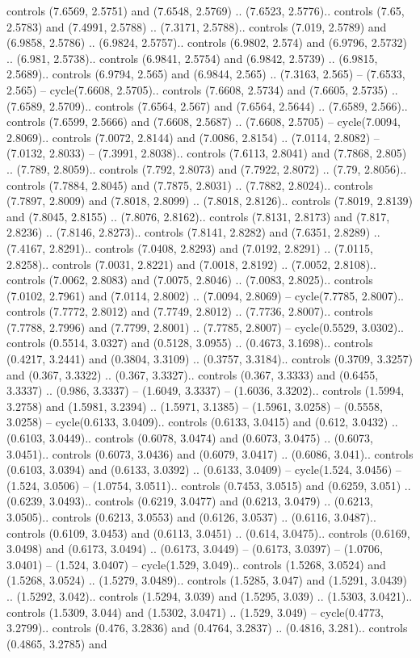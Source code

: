 controls (7.6569, 2.5751) and (7.6548, 2.5769) .. (7.6523, 2.5776).. controls (7.65, 2.5783) and (7.4991, 2.5788) .. (7.3171, 2.5788).. controls (7.019, 2.5789) and (6.9858, 2.5786) .. (6.9824, 2.5757).. controls (6.9802, 2.574) and (6.9796, 2.5732) .. (6.981, 2.5738).. controls (6.9841, 2.5754) and (6.9842, 2.5739) .. (6.9815, 2.5689).. controls (6.9794, 2.565) and (6.9844, 2.565) .. (7.3163, 2.565) -- (7.6533, 2.565) -- cycle(7.6608, 2.5705).. controls (7.6608, 2.5734) and (7.6605, 2.5735) .. (7.6589, 2.5709).. controls (7.6564, 2.567) and (7.6564, 2.5644) .. (7.6589, 2.566).. controls (7.6599, 2.5666) and (7.6608, 2.5687) .. (7.6608, 2.5705) -- cycle(7.0094, 2.8069).. controls (7.0072, 2.8144) and (7.0086, 2.8154) .. (7.0114, 2.8082) -- (7.0132, 2.8033) -- (7.3991, 2.8038).. controls (7.6113, 2.8041) and (7.7868, 2.805) .. (7.789, 2.8059).. controls (7.792, 2.8073) and (7.7922, 2.8072) .. (7.79, 2.8056).. controls (7.7884, 2.8045) and (7.7875, 2.8031) .. (7.7882, 2.8024).. controls (7.7897, 2.8009) and (7.8018, 2.8099) .. (7.8018, 2.8126).. controls (7.8019, 2.8139) and (7.8045, 2.8155) .. (7.8076, 2.8162).. controls (7.8131, 2.8173) and (7.817, 2.8236) .. (7.8146, 2.8273).. controls (7.8141, 2.8282) and (7.6351, 2.8289) .. (7.4167, 2.8291).. controls (7.0408, 2.8293) and (7.0192, 2.8291) .. (7.0115, 2.8258).. controls (7.0031, 2.8221) and (7.0018, 2.8192) .. (7.0052, 2.8108).. controls (7.0062, 2.8083) and (7.0075, 2.8046) .. (7.0083, 2.8025).. controls (7.0102, 2.7961) and (7.0114, 2.8002) .. (7.0094, 2.8069) -- cycle(7.7785, 2.8007).. controls (7.7772, 2.8012) and (7.7749, 2.8012) .. (7.7736, 2.8007).. controls (7.7788, 2.7996) and (7.7799, 2.8001) .. (7.7785, 2.8007) -- cycle(0.5529, 3.0302).. controls (0.5514, 3.0327) and (0.5128, 3.0955) .. (0.4673, 3.1698).. controls (0.4217, 3.2441) and (0.3804, 3.3109) .. (0.3757, 3.3184).. controls (0.3709, 3.3257) and (0.367, 3.3322) .. (0.367, 3.3327).. controls (0.367, 3.3333) and (0.6455, 3.3337) .. (0.986, 3.3337) -- (1.6049, 3.3337) -- (1.6036, 3.3202).. controls (1.5994, 3.2758) and (1.5981, 3.2394) .. (1.5971, 3.1385) -- (1.5961, 3.0258) -- (0.5558, 3.0258) -- cycle(0.6133, 3.0409).. controls (0.6133, 3.0415) and (0.612, 3.0432) .. (0.6103, 3.0449).. controls (0.6078, 3.0474) and (0.6073, 3.0475) .. (0.6073, 3.0451).. controls (0.6073, 3.0436) and (0.6079, 3.0417) .. (0.6086, 3.041).. controls (0.6103, 3.0394) and (0.6133, 3.0392) .. (0.6133, 3.0409) -- cycle(1.524, 3.0456) -- (1.524, 3.0506) -- (1.0754, 3.0511).. controls (0.7453, 3.0515) and (0.6259, 3.051) .. (0.6239, 3.0493).. controls (0.6219, 3.0477) and (0.6213, 3.0479) .. (0.6213, 3.0505).. controls (0.6213, 3.0553) and (0.6126, 3.0537) .. (0.6116, 3.0487).. controls (0.6109, 3.0453) and (0.6113, 3.0451) .. (0.614, 3.0475).. controls (0.6169, 3.0498) and (0.6173, 3.0494) .. (0.6173, 3.0449) -- (0.6173, 3.0397) -- (1.0706, 3.0401) -- (1.524, 3.0407) -- cycle(1.529, 3.049).. controls (1.5268, 3.0524) and (1.5268, 3.0524) .. (1.5279, 3.0489).. controls (1.5285, 3.047) and (1.5291, 3.0439) .. (1.5292, 3.042).. controls (1.5294, 3.039) and (1.5295, 3.039) .. (1.5303, 3.0421).. controls (1.5309, 3.044) and (1.5302, 3.0471) .. (1.529, 3.049) -- cycle(0.4773, 3.2799).. controls (0.476, 3.2836) and (0.4764, 3.2837) .. (0.4816, 3.281).. controls (0.4865, 3.2785) and 